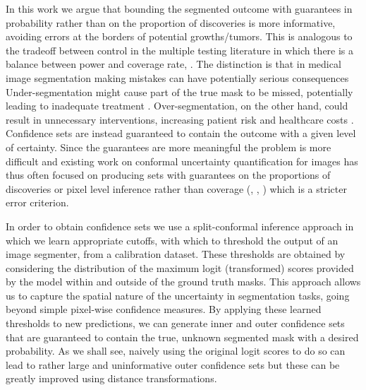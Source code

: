 In this work we argue that bounding the segmented outcome with guarantees in probability rather than on the proportion of discoveries is more informative, avoiding errors at the borders of potential growths/tumors. This is analogous to the tradeoff between  control in the multiple testing literature in which there is a balance between power and coverage rate, . The distinction is that in medical image segmentation making mistakes can have potentially serious consequences Under-segmentation might cause part of the true mask to be missed, potentially leading to inadequate treatment \citep{Jalalifar2022}. Over-segmentation, on the other hand, could result in unnecessary interventions, increasing patient risk and healthcare costs \citep{Gupta2020, Patz2014}. Confidence sets are instead guaranteed to contain the outcome with a given level of certainty. Since the guarantees are more meaningful the problem is more difficult and existing work on conformal uncertainty quantification for images has thus often focused on producing sets with guarantees on the proportions of discoveries or pixel level inference rather than coverage (\cite{Bates2021}, \cite{Wieslander2020}, \cite{Mossina2024}) which is a stricter error criterion. 

In order to obtain confidence sets we use a split-conformal inference approach in which we learn appropriate cutoffs, with which to threshold the output of an image segmenter, from a calibration dataset. These thresholds are obtained by considering the distribution of the maximum logit (transformed) scores provided by the model within and outside of the ground truth masks. This approach allows us to capture the spatial nature of the uncertainty in segmentation tasks, going beyond simple pixel-wise confidence measures. By applying these learned thresholds to new predictions, we can generate inner and outer confidence sets that are guaranteed to contain the true, unknown segmented mask with a desired probability. As we shall see, naively using the original logit scores to do so can lead to rather large and uninformative outer confidence sets but these can be greatly improved using distance transformations. 
 